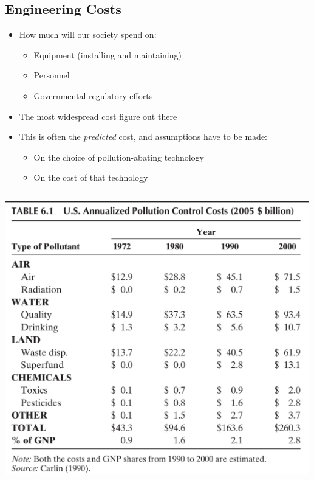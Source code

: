 \documentclass[
]{article}
\providecommand{\tightlist}{%
  \setlength{\itemsep}{0pt}\setlength{\parskip}{0pt}}
\begin{document}
\hypertarget{engineering-costs}{%
\subsection{Engineering Costs}\label{engineering-costs}}

\begin{itemize}
\tightlist
\item
  How much will our society spend on:

  \begin{itemize}
  \tightlist
  \item
    Equipment (installing and maintaining)
  \item
    Personnel
  \item
    Governmental regulatory efforts
  \end{itemize}
\item
  The most widespread cost figure out there
\item
  This is often the \emph{predicted} cost, and assumptions have to be
  made:

  \begin{itemize}
  \tightlist
  \item
    On the choice of pollution-abating technology
  \item
    On the cost of that technology
  \end{itemize}
\end{itemize}

\hypertarget{section-1}{%
\subsection{}\label{section-1}}

\includegraphics[width=\textwidth,height=4.6875in]{figures/m7_engineering_cost.png}
\end{document}
